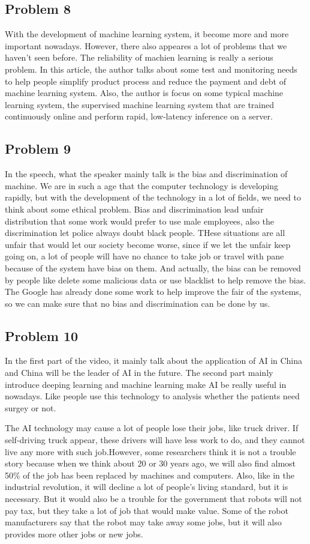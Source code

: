 \documentclass[12pt]{article}
\begin{document}
        \subsection{Problem 8}
            With the development of machine learning system, it become more and more important nowadays. However, there also appeares a
            lot of problems that we haven't seen before. The reliability of machien learning is really a serious problem. In this article,
            the author talks about some test and monitoring needs to help people simplify product process and reduce the payment and debt
            of machine learning system. Also, the author is focus on some typical machine learning system, the supervised machine learning
            system that are trained continuously online and perform rapid, low-latency inference on a server.
		\subsection{Problem 9}
			In the speech, what the speaker mainly talk is the bias and discrimination of machine. We are in such a age that the computer technology is developing rapidly, but with the development of the technology in a lot of fields, we need to think about some ethical problem. Bias and discrimination lead unfair distribution that some work would prefer to use male employees, also the discrimination let police always doubt black people. THese situations are all unfair that would let our society become worse, since if we let the unfair keep going on, a lot of people will have no chance to take job or travel with pane because of the system have bias on them. And actually, the bias can be removed by people like delete some malicious data or use blacklist to help remove the bias. The Google has already done some work to help improve the fair of the systems, so we can make sure that no bias and discrimination can be done by us.
		\subsection{Problem 10}
			\par In the first part of the video, it mainly talk about the application of AI in China and China will be the leader of AI in the future.
The second part mainly introduce deeping learning and machine learning make AI be really useful in nowadays. Like people use this technology to analysis whether the patients need surgey or not.

The AI technology may cause a lot of people lose their jobs, like truck driver. If self-driving truck appear, these drivers will have less work to do, and they cannot live any more with such job.However, some researchers think it is not a trouble story because when we think about 20 or 30 years ago, we will also find almost 50\% of the job has been replaced by machines and computers. Also, like in the industrial revolution, it will decline a lot of people's living standard, but it is necessary. But it would also be a trouble for the government that robots will not pay tax, but they take a lot of job that would make value. Some of the robot manufacturers say that the robot may take away some jobs, but it will also provides more other jobs or new jobs. 
\end{document}

